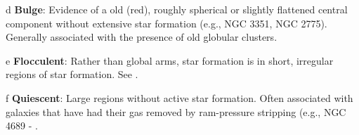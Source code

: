 \begin{table*}
\begin{center}
\begin{threeparttable}
\begin{tablenotes}
\item[d] \textbf{Bulge}: Evidence of a old (red), roughly spherical or slightly flattened central component without extensive star formation (e.g., NGC 3351, NGC 2775). Generally associated with the presence of old globular clusters.  
\item[e] \textbf{Flocculent}: Rather than global arms, star formation is in short, irregular regions of star formation. See \citet{EE87}.
\item[f] \textbf{Quiescent}: Large regions without active star formation. Often associated with galaxies that have had their gas removed by ram-pressure stripping (e.g., NGC 4689 - \citep{kenney_co_1986}.
\end{tablenotes}
\end{threeparttable}
\end{center}
\end{table*}

%